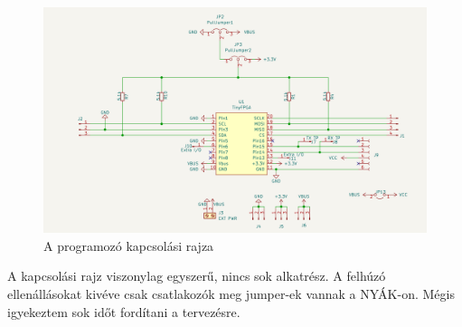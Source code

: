 \documentclass[a4paper,12pt,oneside]{book}
\begin{document}
\begin{figure}[H]
	\centering
	\includegraphics[trim=1mm 1mm 1mm 1mm,scale=0.30]{kapcsolasi rajz.PNG}
	\caption{A programozó kapcsolási rajza}
	\label{teljes kapcsolási rajz}
\end{figure}
A kapcsolási rajz viszonylag egyszerű, nincs sok alkatrész. A felhúzó ellenállásokat kivéve csak csatlakozók meg jumper-ek vannak a NYÁK-on. Mégis igyekeztem sok időt fordítani a tervezésre.
\end{document}
